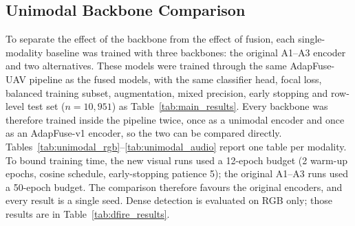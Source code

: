 \subsection{Unimodal Backbone Comparison}
\label{sec:unimodal_backbones}

To separate the effect of the backbone from the effect of fusion, each single-modality baseline was trained with three backbones: the original A1--A3 encoder and two alternatives. These models were trained through the same AdapFuse-UAV pipeline as the fused models, with the same classifier head, focal loss, balanced training subset, augmentation, mixed precision, early stopping and row-level test set ($n=10{,}951$) as Table~\ref{tab:main_results}. Every backbone was therefore trained inside the pipeline twice, once as a unimodal encoder and once as an AdapFuse-v1 encoder, so the two can be compared directly. Tables~\ref{tab:unimodal_rgb}--\ref{tab:unimodal_audio} report one table per modality. To bound training time, the new visual runs used a 12-epoch budget (2 warm-up epochs, cosine schedule, early-stopping patience 5); the original A1--A3 runs used a 50-epoch budget. The comparison therefore favours the original encoders, and every result is a single seed. Dense detection is evaluated on RGB only; those results are in Table~\ref{tab:dfire_results}.

\begin{table}[H]
\centering
\caption[RGB-only scene classification]{RGB-only scene classification with three backbones ($n=10{,}951$). Epochs: run / budget. Best in bold.}
\label{tab:unimodal_rgb}
\end{table}

